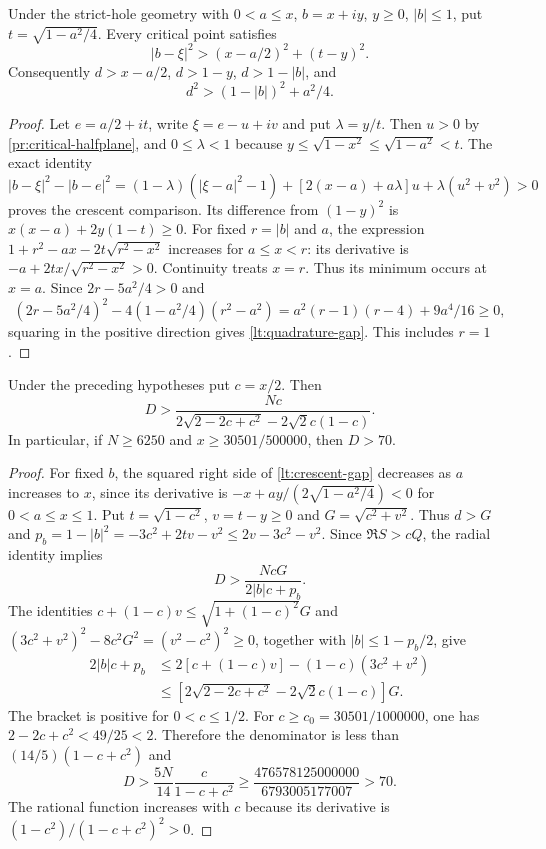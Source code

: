 \begin{lemma}\label{lt:crescent}
Under the strict-hole geometry with $0<a\le x$, $b=x+iy$,
$y\ge0$, $|b|\le1$, put $t=\sqrt{1-a^2/4}$.
Every critical point satisfies
\begin{equation}\label{lt:crescent-gap}
 |b-\xi|^2>(x-a/2)^2+(t-y)^2.
\end{equation}
Consequently $d>x-a/2$, $d>1-y$, $d>1-|b|$, and
\begin{equation}\label{lt:quadrature-gap}
 d^2>(1-|b|)^2+a^2/4.
\end{equation}
\end{lemma}
\begin{proof}
Let $e=a/2+it$, write $\xi=e-u+iv$ and put $\lambda=y/t$.
Then $u>0$ by \eqref{pr:critical-halfplane}, and $0\le\lambda<1$
because $y\le\sqrt{1-x^2}\le\sqrt{1-a^2}<t$.
The exact identity
\[
 |b-\xi|^2-|b-e|^2
 =(1-\lambda)(|\xi-a|^2-1)
       +[2(x-a)+a\lambda]u+\lambda(u^2+v^2)>0
\]
proves the crescent comparison. Its difference from
$(1-y)^2$ is $x(x-a)+2y(1-t)\ge0$.
For fixed $r=|b|$ and $a$, the expression
$1+r^2-ax-2t\sqrt{r^2-x^2}$ increases for $a\le x<r$:
its derivative is $-a+2tx/\sqrt{r^2-x^2}>0$.
Continuity treats $x=r$. Thus its minimum occurs at $x=a$.
Since $2r-5a^2/4>0$ and
\[
 (2r-5a^2/4)^2-4(1-a^2/4)(r^2-a^2)
       =a^2(r-1)(r-4)+9a^4/16\ge0,
\]
squaring in the positive direction gives
\eqref{lt:quadrature-gap}. This includes $r=1$.
\end{proof}

\begin{lemma}\label{lt:direct-D70}
Under the preceding hypotheses put $c=x/2$. Then
\[
 D>\frac{Nc}{2\sqrt{2-2c+c^2}-2\sqrt2c(1-c)}.
\]
In particular, if $N\ge6250$ and $x\ge30501/500000$, then $D>70$.
\end{lemma}
\begin{proof}
For fixed $b$, the squared right side of \eqref{lt:crescent-gap}
decreases as $a$ increases to $x$, since its derivative is
$-x+ay/(2\sqrt{1-a^2/4})<0$ for $0<a\le x\le1$.
Put $t=\sqrt{1-c^2}$, $v=t-y\ge0$ and $G=\sqrt{c^2+v^2}$.
Thus $d>G$ and $p_b=1-|b|^2=-3c^2+2tv-v^2\le2v-3c^2-v^2$.
Since $\Re S>cQ$, the radial identity implies
\[
 D>\frac{NcG}{2|b|c+p_b}.
\]
The identities
$c+(1-c)v\le\sqrt{1+(1-c)^2}G$ and
$(3c^2+v^2)^2-8c^2G^2=(v^2-c^2)^2\ge0$,
together with $|b|\le1-p_b/2$, give
\begin{align*}
 2|b|c+p_b&\le2[c+(1-c)v]-(1-c)(3c^2+v^2)\\
 &\le
 [2\sqrt{2-2c+c^2}-2\sqrt2c(1-c)]G.
\end{align*}
The bracket is positive for $0<c\le1/2$.
For $c\ge c_0=30501/1000000$, one has
$2-2c+c^2<49/25<2$. Therefore the denominator is less than
$(14/5)(1-c+c^2)$ and
\[
 D>\frac{5N}{14}\frac{c}{1-c+c^2}
 \ge\frac{476578125000000}{6793005177007}>70.
\]
The rational function increases with $c$ because its derivative is
$(1-c^2)/(1-c+c^2)^2>0$.
\end{proof}

